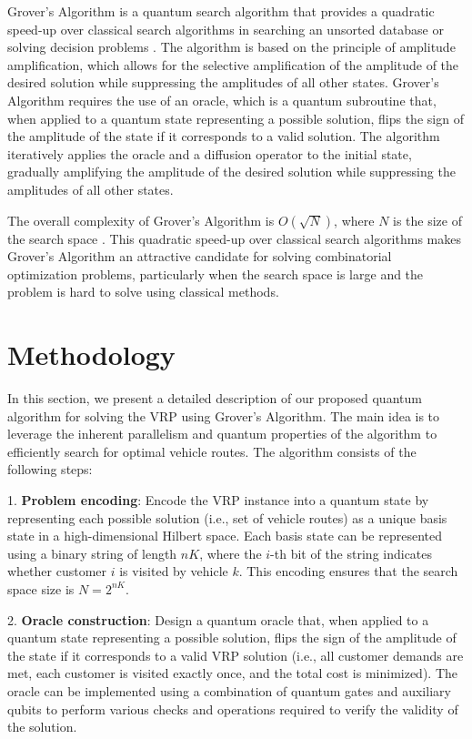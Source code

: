 Grover's Algorithm is a quantum search algorithm that provides a quadratic speed-up over classical search algorithms in searching an unsorted database or solving decision problems \cite{grover1996fast}. The algorithm is based on the principle of amplitude amplification, which allows for the selective amplification of the amplitude of the desired solution while suppressing the amplitudes of all other states. Grover's Algorithm requires the use of an oracle, which is a quantum subroutine that, when applied to a quantum state representing a possible solution, flips the sign of the amplitude of the state if it corresponds to a valid solution. The algorithm iteratively applies the oracle and a diffusion operator to the initial state, gradually amplifying the amplitude of the desired solution while suppressing the amplitudes of all other states.

The overall complexity of Grover's Algorithm is $O(\sqrt{N})$, where $N$ is the size of the search space \cite{nielsen2000quantum}. This quadratic speed-up over classical search algorithms makes Grover's Algorithm an attractive candidate for solving combinatorial optimization problems, particularly when the search space is large and the problem is hard to solve using classical methods.

\section{Methodology}
\label{methodology}

In this section, we present a detailed description of our proposed quantum algorithm for solving the VRP using Grover's Algorithm. The main idea is to leverage the inherent parallelism and quantum properties of the algorithm to efficiently search for optimal vehicle routes. The algorithm consists of the following steps:

1. \textbf{Problem encoding}: Encode the VRP instance into a quantum state by representing each possible solution (i.e., set of vehicle routes) as a unique basis state in a high-dimensional Hilbert space. Each basis state can be represented using a binary string of length $nK$, where the $i$-th bit of the string indicates whether customer $i$ is visited by vehicle $k$. This encoding ensures that the search space size is $N=2^{nK}$.

2. \textbf{Oracle construction}: Design a quantum oracle that, when applied to a quantum state representing a possible solution, flips the sign of the amplitude of the state if it corresponds to a valid VRP solution (i.e., all customer demands are met, each customer is visited exactly once, and the total cost is minimized). The oracle can be implemented using a combination of quantum gates and auxiliary qubits to perform various checks and operations required to verify the validity of the solution.

